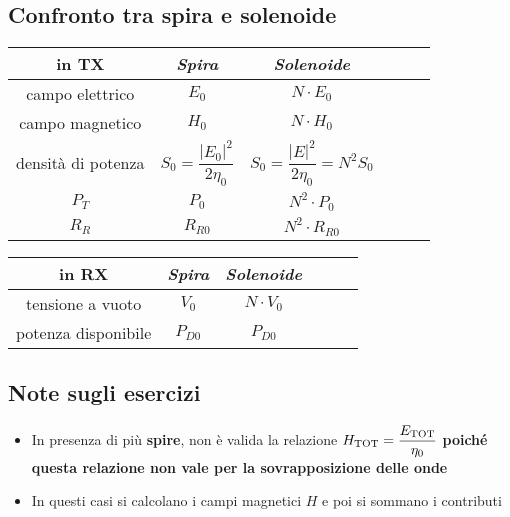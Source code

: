 \documentclass{article}
\begin{document}
\subsection{Confronto tra spira e solenoide}
\vspace{15pt}
\begin{center}
	\begin{tabular}{|Sc|Sc|Sc|}
		\hline 
		\textbf{in TX} & \textit{Spira} & \textit{Solenoide} \\ 
		\hline 	
		campo elettrico & \(E_0\) & \(N \cdot E_0\) \\ 
		\hline 
		campo magnetico & \(H_0\) & \(N \cdot H_0\) \\ 
		\hline 
		densità di potenza & \(S_0 = \dfrac{|E_0|^2}{2 \eta_0}\) & \(S_0 = \dfrac{|E|^2}{2 \eta_0} = N^2 S_0\) \\ 
		\hline 
		\(P_T\) & \(P_0\) & \(N^2 \cdot P_0\) \\ 
		\hline 
		\(R_R\) & \(R_{R0}\) & \(N^2 \cdot R_{R0}\)\\
		\hline
	\end{tabular} 
\end{center}
\vspace{5pt}
\begin{center}
	\begin{tabular}{|Sc|Sc|Sc|}
		\hline 
		\textbf{in RX} & \textit{Spira} & \textit{Solenoide} \\ 
		\hline 	
		tensione a vuoto & \(V_0\) & \(N \cdot V_0\) \\ 
		\hline 
		potenza disponibile & \(P_{D0}\) & \(P_{D0}\) \\ 
		\hline 
	\end{tabular} 
\end{center}
\vspace{5pt}

\subsection{Note sugli esercizi}
\begin{itemize}
	\item In presenza di più \textbf{spire}, non è valida la relazione \( H_{\textnormal{TOT}} = \dfrac{E_{\textnormal{TOT}}}{\eta_0} \) \textbf{poiché questa relazione non vale per la sovrapposizione delle onde}
	\item In questi casi si calcolano i campi magnetici \(H\) e poi si sommano i contributi
\end{itemize}
\end{document}
